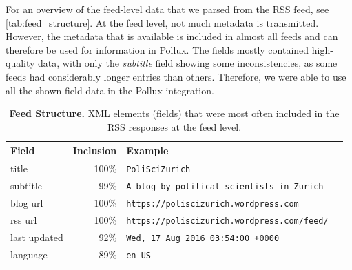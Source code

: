 \documentclass{article}
\begin{document}
For an overview of the feed-level data that we parsed from the RSS feed, see \autoref{tab:feed_structure}.
At the feed level, not much metadata is transmitted. However, the metadata that is available is included in almost all feeds and can therefore be used for information in Pollux. The fields mostly contained high-quality data, with only the \textit{subtitle} field showing some inconsistencies, as some feeds had considerably longer entries than others. Therefore, we were able to use all the shown field data in the Pollux integration.
\begin{table}[htb]
    \caption{\textbf{Feed Structure.} XML elements (fields) that were most often included in the RSS responses at the feed level.}
    \centering
    \begin{tabular}{lrl}
        \toprule
        \cmidrule(r){1-2}
        \textbf{Field} & \textbf{Inclusion} & \textbf{Example}                                   \\
        \midrule
        title          & 100\%              & \verb|PoliSciZurich                              | \\
        subtitle       & 99\%               & \verb|A blog by political scientists in Zurich   | \\
        blog url       & 100\%              & \verb|https://poliscizurich.wordpress.com        | \\
        rss url        & 100\%              & \verb|https://poliscizurich.wordpress.com/feed/  | \\
        last updated   & 92\%               & \verb|Wed, 17 Aug 2016 03:54:00 +0000            | \\
        language       & 89\%               & \verb|en-US|                                       \\
        \bottomrule
    \end{tabular}
    \label{tab:feed_structure}
\end{table}
\end{document}
